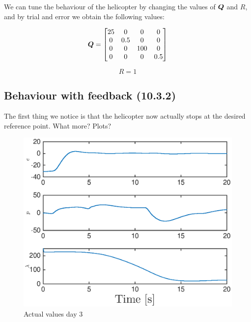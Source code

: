 We can tune the behaviour of the helicopter by changing the values of $\bm{Q}$ and $R$, and by trial and error we obtain the following values:

\begin{equation}
	\bm{Q} = 
    \begin{bmatrix}
    	25 & 0 & 0 & 0 \\
        0 & 0.5 & 0 & 0 \\
        0 & 0 & 100 & 0 \\
        0 & 0 & 0 & 0.5
    \end{bmatrix}
\end{equation}

\begin{equation}
	R = 1
\end{equation}

\subsection{Behaviour with feedback (10.3.2)}

The first thing we notice is that the helicopter now actually stops at the desired reference point. What more? Plots?

\begin{figure}[H]
	\centering
	\includegraphics[width=\textwidth]{day3}
	\caption{Actual values day 3}
	\label{fig:day3}
\end{figure}

